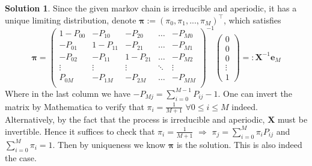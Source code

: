 \documentclass[a4paper, 10pt]{article}
\theoremstyle{definition}
\theoremstyle{hSol}
\newtheorem*{solution}{Solution}
\begin{document}
\begin{solution} Since the given markov chain is irreducible and aperiodic, it has a unique limiting distribution, denote $\bm{\pi}:=(\pi_0, \pi_1, ..., \pi_M)^{\top}$, which satisfies
\begin{equation}
  \bm{\pi} = \begin{pmatrix}
    1-P_{00} & -P_{10} & -P_{20} & \dots & -P_{M0} \\
    -P_{01} & 1-P_{11} & -P_{21} & \dots & -P_{M1} \\
    -P_{02} & -P_{11} & 1-P_{21} & \dots & -P_{M2} \\
    \vdots & \vdots & \vdots & \ddots & \vdots \\
    P_{0M} & -P_{1M} & -P_{2M} & \dots & -P_{MM} \\
  \end{pmatrix}^{-1}
  \begin{pmatrix}
    0\\0\\0\\ \vdots \\ 1
  \end{pmatrix} =: \bm{X}^{-1}\bm{e}_M
\end{equation}
Where in the last column we have $-P_{Mj}=\sum_{i=0}^{M-1}P_{ij}-1$. One can invert the matrix by Mathematica to verify that $\pi_i=\frac{1}{M+1}$ $\forall 0\leq i\leq M$ indeed. \\
Alternatively, by the fact that the process is irreducible and aperiodic, $\bm{X}$ must be invertible. Hence it suffices to check that $\pi_i=\frac{1}{M+1}$ $\Rightarrow$ $\pi_j=\sum_{i=0}^M \pi_i P_{ij}$ and $\sum_{i=0}^M \pi_i=1$. Then by uniqueness we know $\bm{\pi}$ is the solution. This is also indeed the case. 
\end{solution}
\end{document}
